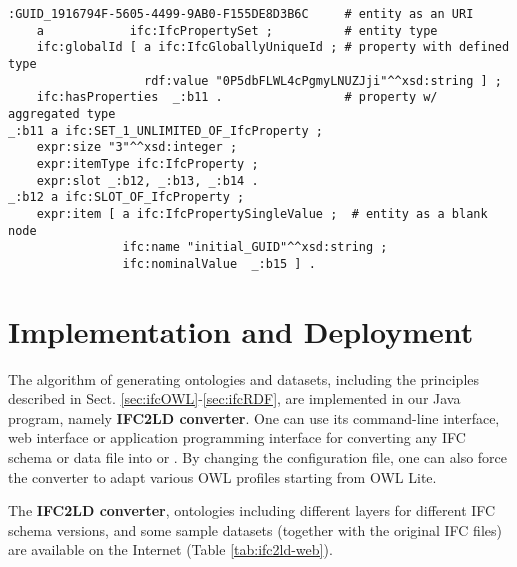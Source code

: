 \begin{lstlisting}
:GUID_1916794F-5605-4499-9AB0-F155DE8D3B6C     # entity as an URI
    a            ifc:IfcPropertySet ;          # entity type
    ifc:globalId [ a ifc:IfcGloballyUniqueId ; # property with defined type
                   rdf:value "0P5dbFLWL4cPgmyLNUZJji"^^xsd:string ] ;
    ifc:hasProperties  _:b11 .                 # property w/ aggregated type
_:b11 a ifc:SET_1_UNLIMITED_OF_IfcProperty ;
    expr:size "3"^^xsd:integer ;
    expr:itemType ifc:IfcProperty ;
    expr:slot _:b12, _:b13, _:b14 .
_:b12 a ifc:SLOT_OF_IfcProperty ;
    expr:item [ a ifc:IfcPropertySingleValue ;  # entity as a blank node
                ifc:name "initial_GUID"^^xsd:string ;
                ifc:nominalValue  _:b15 ] .
\end{lstlisting}



\section{Implementation and Deployment}
\label{sec:deployment}

The algorithm of generating \ifcowl{} ontologies and \ifcrdf{} datasets, including the principles described in Sect. \ref{sec:ifcOWL}-\ref{sec:ifcRDF}, are implemented in our Java program, namely \textbf{IFC2LD converter}. One can use its command-line interface, web interface or application programming interface for converting any IFC schema or data file into \ifcowl{} or \ifcrdf{}. By changing the configuration file, one can also force the converter to adapt various OWL profiles starting from OWL Lite.

The \textbf{IFC2LD converter}, \ifcowl{} ontologies including different layers for different IFC schema versions, and some sample \ifcrdf{} datasets (together with the original IFC files) are available on the Internet (Table \ref{tab:ifc2ld-web}).


